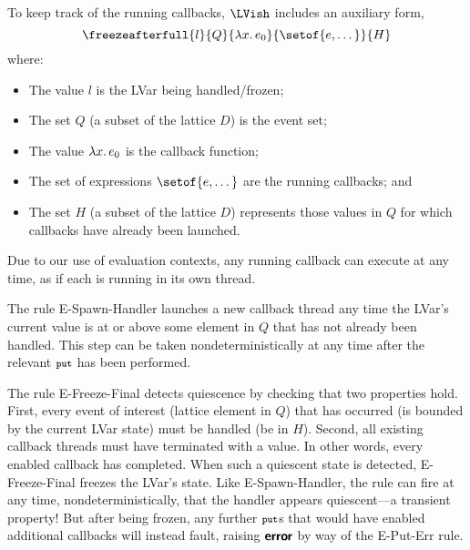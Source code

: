 

\noindent
To keep track of the running callbacks, $\LVish$ includes an auxiliary form,{
\[
   \freezeafterfull{l}{Q}{\lam{x}{e_0}}{\setof{e, \dots}}{H}
\]}%
where:
\begin{itemize}
\item The value $l$ is the LVar being handled/frozen;
\item The set $Q$ (a subset of the lattice $D$) is the event set;
\item The value $\lambda x.\,e_0$ is the callback function;
\item The set of expressions $\setof{e, \dots}$ are the running callbacks; and
\item The set $H$ (a subset of the lattice $D$) represents those values in $Q$
  for which callbacks have already been launched.
\end{itemize}
Due to our use of evaluation contexts, any running callback can execute at any
time, as if each is running in its own thread.

The rule {\sc E-Spawn-Handler} launches a new callback thread any time the
LVar's current value is at or above some element in $Q$ that has not already been
handled.  This step can be taken nondeterministically at any time after the
relevant $\mbox{\footnotesize \texttt{put}}$ has been performed.

The rule {\sc E-Freeze-Final} detects quiescence by checking that two
properties hold.  First, every event of interest (lattice element in $Q$) that has
occurred (is bounded by the current LVar state) must be handled (be in $H$).
Second, all existing callback threads must have terminated with a value.  In
other words, every enabled callback has completed.  When such a quiescent state
is detected, {\sc E-Freeze-Final} freezes the LVar's state.  Like {\sc
  E-Spawn-Handler}, the rule can fire at any time, nondeterministically, that
the handler appears quiescent---a transient property!  But after being frozen,
any further $\mbox{\footnotesize \texttt{put}}$s that would have enabled additional callbacks will instead
fault, raising $\textbf{\textsf{error}}$ by way of the {\sc E-Put-Err} rule.

